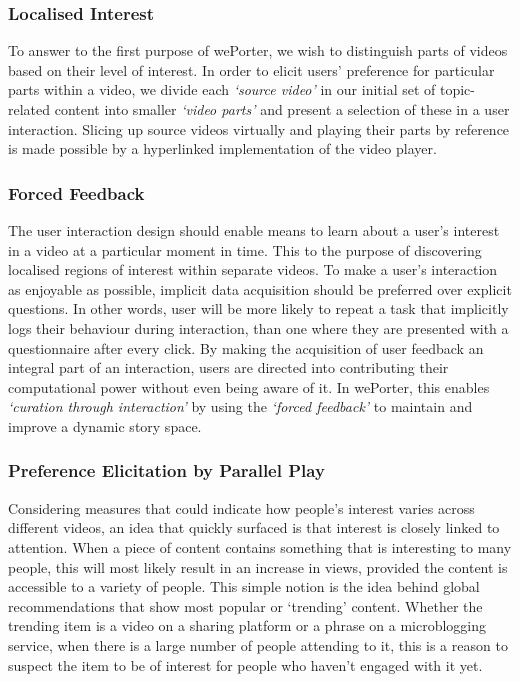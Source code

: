 \subsubsection{Localised Interest} %
To answer to the first purpose of wePorter, we wish to distinguish parts of videos based on their level of interest. In order to elicit users' preference for particular parts within a video, we divide each \emph{`source video'} in our initial set of topic-related content into smaller \emph{`video parts'} and present a selection of these in a user interaction. Slicing up source videos virtually and playing their parts by reference is made possible by a hyperlinked implementation of the video player.

\subsubsection{Forced Feedback}
The user interaction design should enable means to learn about a user's interest in a video at a particular moment in time. This to the purpose of discovering localised regions of interest within separate videos. To make a user's interaction as enjoyable as possible, implicit data acquisition should be preferred over explicit questions. In other words, user will be more likely to repeat a task that implicitly logs their behaviour during interaction, than one where they are presented with a questionnaire after every click. By making the acquisition of user feedback an integral part of an interaction, users are directed into contributing their computational power without even being aware of it. In wePorter, this enables \emph{`curation through interaction'} by using the \emph{`forced feedback'} to maintain and improve a dynamic story space.

\subsubsection{Preference Elicitation by Parallel Play}

Considering measures that could indicate how people's interest varies across different videos, an idea that quickly surfaced is that interest is closely linked to attention. When a piece of content contains something that is interesting to many people, this will most likely result in an increase in views, provided the content is accessible to a variety of people. This simple notion is the idea behind global recommendations that show most popular or `trending' content. Whether the trending item is a video on a sharing platform or a phrase on a microblogging service, when there is a large number of people attending to it, this is a reason to suspect the item to be of interest for people who haven't engaged with it yet.

